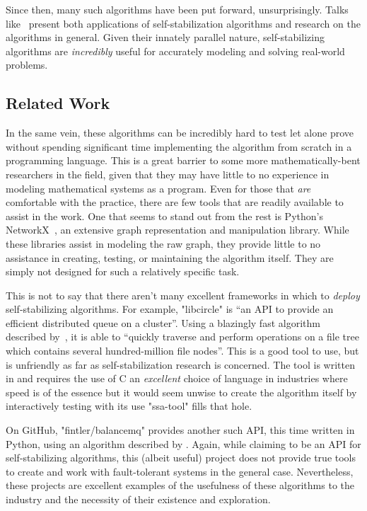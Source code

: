 Since then, many such algorithms have been put forward, unsurprisingly.
Talks like~\autocite{dolev:talk} present both
  applications of self-stabilization algorithms and
  research on the algorithms in general.
Given their innately parallel nature,
  self-stabilizing algorithms are \emph{incredibly} useful
  for accurately modeling and solving real-world problems.

\subsection{Related Work}
\label{sec:introduction:related-work}
In the same vein, these algorithms can be incredibly hard to test
  \Dash let alone prove \Dash
  without spending significant time implementing the algorithm
  from scratch in a programming language.
This is a great barrier to some more mathematically-bent researchers in the field,
  given that they may have little to no experience in modeling mathematical systems as a program.
Even for those that \emph{are} comfortable with the practice,
  there are few tools that are readily available to assist in the work.
One that seems to stand out from the rest is Python's NetworkX~\autocite{hagberg:networkx},
  an extensive graph representation and manipulation library.
While these libraries assist in modeling the raw graph,
  they provide little to no assistance in creating, testing, or maintaining the algorithm itself.
They are simply not designed for such a relatively specific task.

This is not to say that there aren't many excellent frameworks in which
  to \emph{deploy} self-stabilizing algorithms.
For example, "libcircle" is \enquote{an API to provide an efficient distributed queue on a cluster}.
Using a blazingly fast algorithm described by~\autocite{lafon:libcircle},
  it is able to \enquote{quickly traverse and perform operations on a file tree
    which contains several hundred-million file nodes}.
This is a good tool to use, but is unfriendly as far as self-stabilization research is concerned.
The tool is written in and requires the use of C
  \Dash an \emph{excellent} choice of language in industries where speed is of the essence \Dash
  but it would seem unwise to create the algorithm itself
  by interactively testing with its use \Dash "ssa-tool" fills that hole.

On GitHub, "fintler/balancemq" provides another such API, this time written in Python,
  using an algorithm described by \autocite{lafon:balanceMQ}.
Again, while claiming to be an API for self-stabilizing algorithms,
  this (albeit useful) project does not provide true tools to create and work with
  fault-tolerant systems in the general case.
Nevertheless, these projects are excellent examples of the
  usefulness of these algorithms to the industry and
  the necessity of their existence and exploration.

